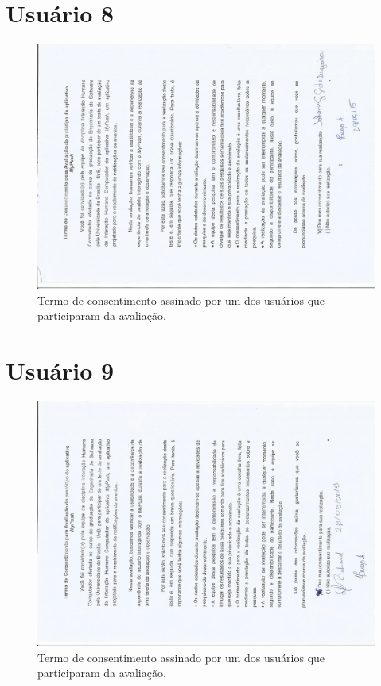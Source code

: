 \begin{anexosenv}
      \section*{Usuário 8}
    \begin{figure}[!htbp]
      \centering
      \includegraphics[scale=0.6, angle=-90]{editaveis/figuras/iohana}
      \caption{Termo de consentimento assinado por um dos usuários que participaram da avaliação.}
      \label{termo_consentimento_1}
    \end{figure}
    \pagebreak
    
      \section*{Usuário 9}
    \begin{figure}[!htbp]
      \centering
      \includegraphics[scale=0.6, angle=-90]{editaveis/figuras/guilherme}
      \caption{Termo de consentimento assinado por um dos usuários que participaram da avaliação.}
      \label{termo_consentimento_1}
    \end{figure}
    \pagebreak
    

\end{anexosenv}
